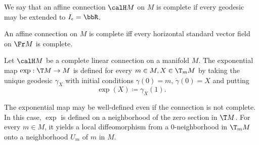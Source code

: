 We say that an affine connection $\calH M$ on $M$ is complete if every geodesic may be extended to $I_\epsilon=\bbR$.

\begin{cor}[{{\cite[Cor.~2.1.24]{RS2}}}]\label{cor 2.1.24 RS2}
    An affine connection on $M$ is complete iff every horizontal standard vector field on $\Fr M$ is complete.
\end{cor}


\begin{defn}
    Let $\calH M$ be a complete linear connection on a manifold $M$. The exponential map $\exp: \T M\to M$ is defined for every $m\in M, X\in \T_mM$ by taking the unique geodesic $\gamma_X$ with initial conditions $\gamma(0)=m$, $\dot\gamma(0)=X$ and putting 
    \[\exp(X)\coloneqq \gamma_X(1).\]
\end{defn}

\begin{rem}
    The exponential map may be well-defined even if the connection is not complete. In this case, $\exp$ is defined on a neighborhood of the zero section in $\T M$. For every $m\in M$, it yields a local diffeomorphism from a $0$-neighborhood in $\T_m M$ onto a neighborhood $U_m$ of $m$ in $M$.
\end{rem}



